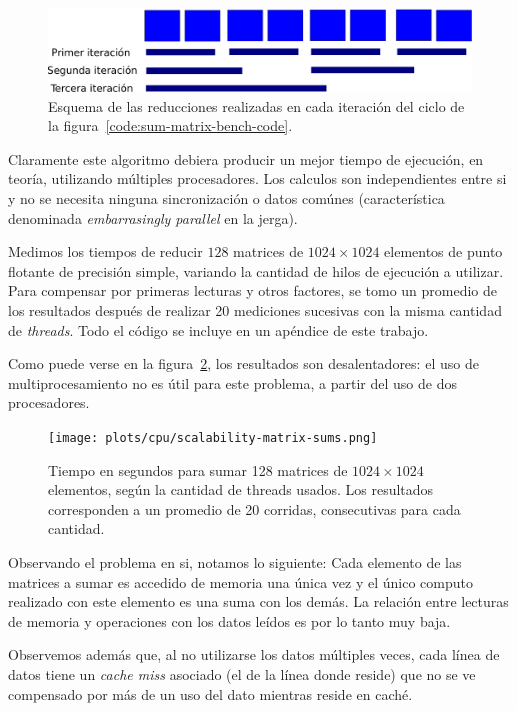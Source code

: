 \begin{figure}[htbp]
   \centering
   \includegraphics[width=\plotwidth]{images/reductions.png}
   \caption{Esquema de las reducciones realizadas en cada iteraci\'on del ciclo de la
   figura~\ref{code:sum-matrix-bench-code}.}
   \label{fig:sum-matrix-bench-reduce}
\end{figure}

Claramente este algoritmo debiera producir un mejor tiempo de ejecuci\'on, en
teor\'ia, utilizando m\'ultiples procesadores. Los calculos son independientes
entre si y no se necesita ninguna sincronizaci\'on o datos com\'unes (caracter\'istica
denominada \textit{embarrasingly parallel} en la jerga).

Medimos los tiempos de reducir $128$ matrices de $1024 \times 1024$ elementos de punto
flotante de precisi\'on simple, variando la cantidad de hilos de ejecuci\'on a
utilizar. Para compensar por primeras lecturas y otros factores, se tomo un promedio
de los resultados despu\'es de realizar 20 mediciones sucesivas con la misma
cantidad de \textit{threads}. Todo el c\'odigo se incluye en un ap\'endice de este
trabajo.

Como puede verse en la figura~\ref{fig:sum-matrix-bench-result}, los resultados
son desalentadores: el uso de multiprocesamiento no es \'util para este problema,
a partir del uso de dos procesadores.

\begin{figure}[htbp]
   \centering
   \texttt{[image: plots/cpu/scalability-matrix-sums.png]}
   \caption{Tiempo en segundos para sumar 128 matrices de $1024 \times 1024$
   elementos, seg\'un la cantidad de threads usados. Los resultados corresponden
   a un promedio de 20 corridas, consecutivas para cada cantidad.}
   \label{fig:sum-matrix-bench-result}
\end{figure}

Observando el problema en si, notamos lo siguiente: Cada elemento de las
matrices a sumar es accedido de memoria una \'unica vez y el \'unico computo
realizado con este elemento es una suma con los dem\'as. La relaci\'on entre
lecturas de memoria y operaciones con los datos le\'idos es por lo tanto muy baja.

Observemos adem\'as que, al no utilizarse los datos m\'ultiples veces, cada l\'inea
de datos tiene un \textit{cache miss} asociado (el de la l\'inea donde reside) que
no se ve compensado por m\'as de un uso del dato mientras reside en cach\'e.

